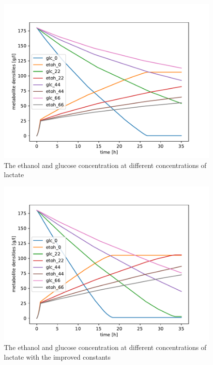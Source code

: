 		\begin{figure}[h]
			\centering
			\includegraphics[width=\linewidth]{figures/results/yeast/similar_plot.pdf}
			\caption{The ethanol and glucose concentration at different concentrations of lactate}
			\label{fig:yeast_simfig}
		\end{figure}

		\begin{figure}[h]
			\centering
			\includegraphics[width=\linewidth]{figures/results/better_yeast/similar_plot.pdf}
			\caption{The ethanol and glucose concentration at different concentrations of lactate with the improved constants}
			\label{fig:yeast_better_simfig}
		\end{figure}
		
